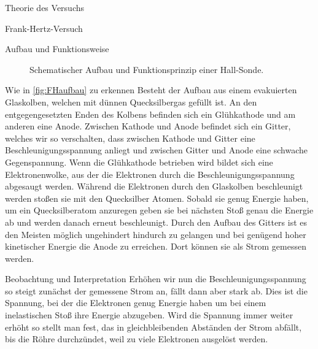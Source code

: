 \documentclass[pdftex, a4paper,11pt, twoside, ngerman]{report}
\begin{document}
\begin{chapter}{Theorie des Versuchs}
\begin{section}{Frank-Hertz-Versuch}
\begin{subsection}{Aufbau und Funktionsweise}
\begin{figure}[b!]
\begin{minipage}{0.48\textwidth}
                \caption{Schematischer Aufbau und Funktionsprinzip einer
                    Hall-Sonde. \cite{bib:Hallsonde}}
            \label{fig:hallsensor}
          \end{minipage}
        \end{figure}
        Wie in \cref{fig:FHaufbau} zu erkennen Besteht der Aufbau aus einem
        evakuierten Glaskolben, welchen mit dünnen Quecksilbergas gefüllt ist. 
        An den entgegengesetzten Enden des Kolbens befinden sich ein
        Glühkathode und am anderen eine Anode. Zwischen Kathode und Anode
        befindet sich ein Gitter, welches wir so verschalten, dass zwischen
        Kathode und Gitter eine Beschleunigungsspannung anliegt und zwischen
        Gitter und Anode eine schwache Gegenspannung. Wenn die Glühkathode
        betrieben wird bildet sich eine Elektronenwolke, aus der die Elektronen
        durch die Beschleunigungsspannung abgesaugt werden. Während die
        Elektronen durch den Glaskolben beschleunigt werden stoßen sie mit den
        Quecksilber Atomen. Sobald sie genug Energie haben, um ein
        Quecksilberatom anzuregen geben sie bei nächsten Stoß genau die Energie
        ab und werden danach erneut beschleunigt. Durch den Aufbau des Gitters
        ist es den Meisten möglich ungehindert hindurch zu gelangen und bei
        genügend hoher kinetischer Energie die Anode zu erreichen. Dort können
        sie als Strom gemessen werden.
        
      \end{subsection}
      
      
      
      \begin{subsection}{Beobachtung und Interpretation}
        Erhöhen wir nun die Beschleunigungsspannung so steigt zunächst der
        gemessene Strom an, fällt dann aber stark ab. Dies ist die Spannung,
        bei der die Elektronen genug Energie haben um bei einem inelastischen
        Stoß ihre Energie abzugeben. Wird die Spannung immer weiter erhöht so
        stellt man fest, das in gleichbleibenden Abständen der Strom abfällt,
        bis die Röhre durchzündet, weil zu viele Elektronen ausgelöst werden. 
        

\end{subsection}
\end{section}
\end{chapter}
\end{document}
